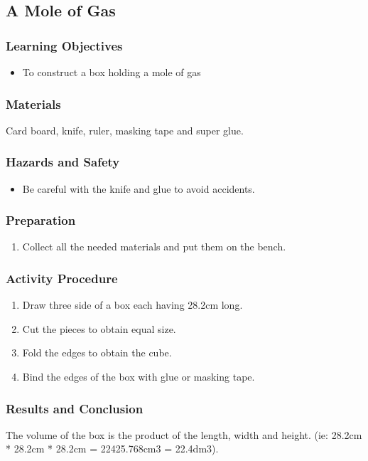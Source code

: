 \subsection{A Mole of Gas}

\subsubsection*{Learning Objectives}
\begin{itemize}
\item{To construct a box holding a mole of gas}
\end{itemize}

\subsubsection*{Materials}
Card board, knife, ruler, masking tape and super glue.

\subsubsection*{Hazards and Safety}
\begin{itemize}
\item{Be careful with the knife and glue to avoid accidents.}
\end{itemize}

\subsubsection*{Preparation}
\begin{enumerate}
\item{Collect all the needed materials and put them on the bench.}
\end{enumerate}

\subsubsection*{Activity Procedure}
\begin{enumerate}
\item{Draw three side of a box each having 28.2cm long.}
\item{Cut the pieces to obtain equal size.}
\item{Fold the edges to obtain the cube.}
\item{Bind the edges of the box with glue or masking tape.}
\end{enumerate}

\subsubsection*{Results and Conclusion}
The volume of the box is the product of the length, width and height. (ie: 28.2cm * 28.2cm * 28.2cm = 22425.768cm3 = 22.4dm3).

